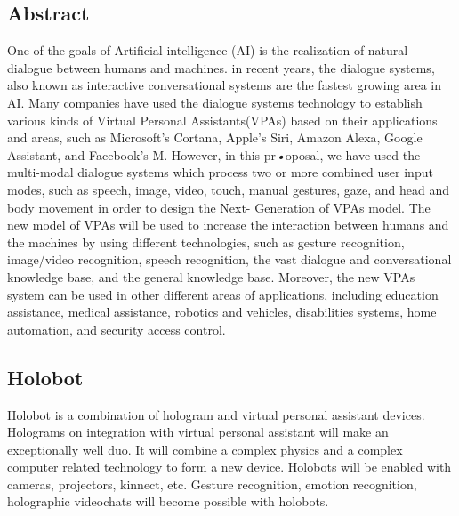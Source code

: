 \documentclass[12pt,a4paper]{article}
\begin{document}
\begin{center}
\section{Abstract}
\end{center}
\noindent
\par One of the goals of Artificial intelligence (AI) is the
realization of natural dialogue between humans and machines.
in recent years, the dialogue systems, also known as interactive
conversational systems are the fastest growing area in AI. Many
companies have used the dialogue systems technology to establish
various kinds of Virtual Personal Assistants(VPAs) based on
their applications and areas, such as Microsoft’s Cortana,
Apple’s Siri, Amazon Alexa, Google Assistant, and Facebook’s
M. However, in this pr\textsl{•}oposal, we have used the multi-modal
dialogue systems which process two or more combined user input
modes, such as speech, image, video, touch, manual gestures,
gaze, and head and body movement in order to design the Next-
Generation of VPAs model. The new model of VPAs will be used
to increase the interaction between humans and the machines by
using different technologies, such as gesture recognition,
image/video recognition, speech recognition, the vast dialogue
and conversational knowledge base, and the general knowledge
base. Moreover, the new VPAs system can be used in other
different areas of applications, including education assistance,
medical assistance, robotics and vehicles, disabilities systems,
home automation, and security access control.
\newpage
\tableofcontents
\newpage
\begin{center}
\section{Holobot}
\end{center}
Holobot is a combination of hologram and virtual personal assistant devices. Holograms on integration with virtual personal assistant will make an exceptionally well duo. It will combine a complex physics and a complex computer related technology to form a new device. Holobots will be enabled with cameras, projectors, kinnect, etc. Gesture recognition, emotion recognition, holographic videochats will become possible with holobots.
\end{document}
